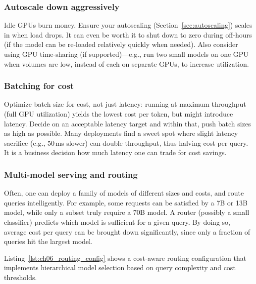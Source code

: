 \subsubsection{Autoscale down aggressively}
Idle GPUs burn money. Ensure your autoscaling (Section~\ref{sec:autoscaling}) scales in when load drops. It can even be worth it to shut down to zero during off-hours (if the model can be re-loaded relatively quickly when needed). Also consider using GPU time-sharing (if supported)---e.g., run two small models on one GPU when volumes are low, instead of each on separate GPUs, to increase utilization.

\subsubsection{Batching for cost}
Optimize batch size for cost, not just latency: running at maximum throughput (full GPU utilization) yields the lowest cost per token, but might introduce latency. Decide on an acceptable latency target and within that, push batch sizes as high as possible. Many deployments find a sweet spot where slight latency sacrifice (e.g., 50\,ms slower) can double throughput, thus halving cost per query. It is a business decision how much latency one can trade for cost savings.

\subsubsection{Multi-model serving and routing}
Often, one can deploy a family of models of different sizes and costs, and route queries intelligently. For example, some requests can be satisfied by a 7B or 13B model, while only a subset truly require a 70B model. A router (possibly a small classifier) predicts which model is sufficient for a given query. By doing so, average cost per query can be brought down significantly, since only a fraction of queries hit the largest model.

Listing~\ref{lst:ch06_routing_config} shows a cost-aware routing configuration that implements hierarchical model selection based on query complexity and cost thresholds.

